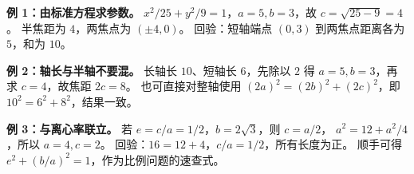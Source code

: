 \begin{examplebox}
\textbf{例 1：由标准方程求参数。}
$x^2/25+y^2/9=1$，$a=5,b=3$，故 $c=\sqrt{25-9}=\boxed4$。
半焦距为 $4$，两焦点为 $(\pm4,0)$。
回验：短轴端点 $(0,3)$ 到两焦点距离各为 $5$，和为 $10$。

\medskip
\textbf{例 2：轴长与半轴不要混。}
长轴长 $10$、短轴长 $6$，先除以 $2$ 得 $a=5,b=3$，再求 $c=4$，故焦距 $\boxed{2c=8}$。
也可直接对整轴使用 $(2a)^2=(2b)^2+(2c)^2$，即 $10^2=6^2+8^2$，结果一致。

\medskip
\textbf{例 3：与离心率联立。}
若 $e=c/a=1/2$，$b=2\sqrt3$，则 $c=a/2$，
$a^2=12+a^2/4$，所以 $\boxed{a=4,c=2}$。
回验：$16=12+4$，$c/a=1/2$，所有长度为正。
顺手可得 $e^2+(b/a)^2=1$，作为比例问题的速查式。
\end{examplebox}
\clearpage

